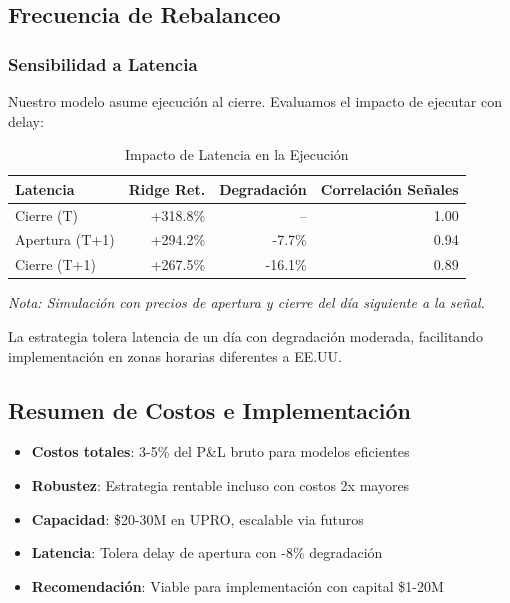 \subsection{Frecuencia de Rebalanceo}
\label{subsec:rebalancing}

\subsubsection{Sensibilidad a Latencia}

Nuestro modelo asume ejecuci\'on al cierre. Evaluamos el impacto de ejecutar con delay:

\begin{table}[htbp]
\centering
\caption{Impacto de Latencia en la Ejecuci\'on}
\label{tab:latency}
\begin{tabular}{@{}lrrr@{}}
\toprule
\textbf{Latencia} & \textbf{Ridge Ret.} & \textbf{Degradaci\'on} & \textbf{Correlaci\'on Se\~nales} \\
\midrule
Cierre (T) & +318.8\% & -- & 1.00 \\
Apertura (T+1) & +294.2\% & -7.7\% & 0.94 \\
Cierre (T+1) & +267.5\% & -16.1\% & 0.89 \\
\bottomrule
\end{tabular}
\vspace{0.2cm}
\small\textit{
\small
Nota: Simulaci\'on con precios de apertura y cierre del d\'ia siguiente a la se\~nal.}
\end{table}

La estrategia tolera latencia de un d\'ia con degradaci\'on moderada, facilitando implementaci\'on en zonas horarias diferentes a EE.UU.

\subsection{Resumen de Costos e Implementaci\'on}
\label{subsec:cost_summary}

\begin{tcolorbox}[colback=gray!5!white,colframe=gray!75!black,title=Resumen: Viabilidad de Implementaci\'on]
\begin{itemize}
    \item \textbf{Costos totales}: 3-5\% del P\&L bruto para modelos eficientes
    \item \textbf{Robustez}: Estrategia rentable incluso con costos 2x mayores
    \item \textbf{Capacidad}: \$20-30M en UPRO, escalable via futuros
    \item \textbf{Latencia}: Tolera delay de apertura con -8\% degradaci\'on
    \item \textbf{Recomendaci\'on}: Viable para implementaci\'on con capital \$1-20M
\end{itemize}
\end{tcolorbox}
